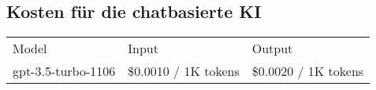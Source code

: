 \subsection{Kosten für die chatbasierte KI}\label{subsec:kosten-für-die-chatbasierte-ki}


\begin{table}[H]
    \begin{tabular}{lll}
    Model              & Input                & Output               \\
    gpt-3.5-turbo-1106 & \$0.0010 / 1K tokens & \$0.0020 / 1K tokens
    \end{tabular}
\end{table}




